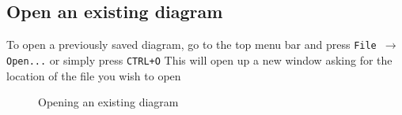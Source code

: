 \documentclass[a4paper]{article}
\begin{document}
\subsection{Open an existing diagram} 
To open a previously saved diagram, go to the top menu bar and press \texttt{File $\rightarrow$ Open...} or simply press \texttt{CTRL+O}
This will open up a new window asking for the location of the file you wish to open

\begin{center} \begin{figure}[H]
\vspace{-20pt}
\caption{Opening an existing diagram} 
\vspace{-20pt}
 \end{figure} \end{center}
\end{document}
